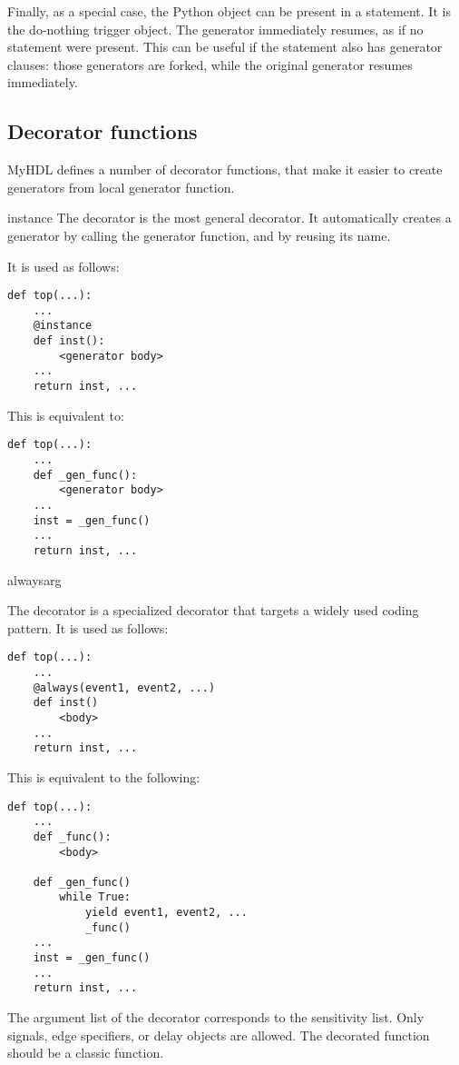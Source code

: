 Finally, as a special case, the Python  object can be
present in a  statement. It is the do-nothing
trigger object. The generator immediately resumes, as if no
 statement were present. This can be useful if the
 statement also has generator clauses: those generators
are forked, while the original generator resumes immediately.

\subsection{Decorator functions \label{ref-deco}}

MyHDL defines a number of decorator functions, that make it easier to
create generators from local generator function.

\begin{funcdesc}{instance}{}
The  decorator is the most general decorator.  It
automatically creates a generator by calling the generator function,
and by reusing its name.

It is used as follows:

\begin{verbatim}
def top(...):
    ...
    @instance
    def inst():
        <generator body>
    ...
    return inst, ...
\end{verbatim}

This is equivalent to:

\begin{verbatim}
def top(...):
    ...
    def _gen_func():
        <generator body>
    ...
    inst = _gen_func()
    ...
    return inst, ...
\end{verbatim}

\end{funcdesc}
    

\begin{funcdesc}{always}{arg }

The  decorator is a specialized decorator that targets a widely used
coding pattern. It is used as follows:

\begin{verbatim}
def top(...):
    ...
    @always(event1, event2, ...)
    def inst()
        <body>
    ...
    return inst, ...
\end{verbatim}

This is equivalent to the following:

\begin{verbatim}
def top(...):
    ...
    def _func():
        <body>

    def _gen_func()
        while True:
            yield event1, event2, ... 
            _func()
    ...
    inst = _gen_func()
    ...
    return inst, ...
\end{verbatim}


The argument list of the decorator corresponds to the sensitivity
list. Only signals, edge specifiers, or delay objects are allowed.
The decorated function should be a classic function.


\end{funcdesc}


